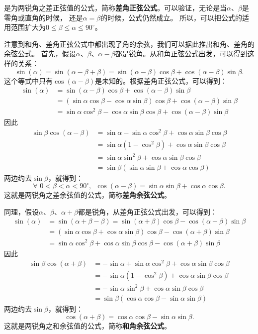 \documentclass[12pt,UTF8]{ctexbook}
\begin{document}
是为两锐角之差正弦值的公式，简称\textbf{差角正弦公式}。可以验证，无论是当$\alpha$、$\beta$是零角或直角的时候，
还是$\alpha = \beta$的时候，公式仍然成立。
所以，可以把公式的适用范围扩大为$0 \leqslant \beta \leqslant \alpha \leqslant 90^\circ$。

注意到和角、差角正弦公式中都出现了角的余弦，我们可以据此推出和角、差角的余弦公式。
首先，假设$\alpha$、$\beta$、$\alpha - \beta$都是锐角。从和角正弦公式出发，可以得到这样的关系：
$$ \sin(\alpha) = \sin(\alpha - \beta + \beta) = \sin (\alpha - \beta) \cos \beta + \cos(\alpha - \beta) \sin\beta.$$
这个等式中只有$\cos(\alpha - \beta)$是未知的。根据差角正弦公式，可以得到：
\begin{align*}
    \sin(\alpha) &= \sin (\alpha - \beta) \cos \beta + \cos(\alpha - \beta) \sin\beta  \\
    &= (\sin\alpha \cos \beta - \cos \alpha \sin\beta) \cos \beta + \cos(\alpha - \beta) \sin\beta  \\
    &= \sin\alpha \cos^2 \beta - \cos \alpha \sin\beta \cos \beta + \cos(\alpha - \beta) \sin\beta 
 \end{align*}
因此
\begin{align*}
    \sin\beta \cos(\alpha - \beta) &= \sin \alpha - \sin\alpha \cos^2 \beta + \cos \alpha \sin\beta \cos \beta  \\
    &= \sin \alpha (1 - \cos^2 \beta) + \cos \alpha \sin\beta \cos \beta  \\
    &= \sin\alpha \sin^2 \beta + \cos \alpha \sin\beta \cos \beta  \\
    &= \sin\beta (\sin\alpha \sin \beta +  \cos \alpha \cos \beta) 
 \end{align*}
两边约去$\sin \beta$，就得到：
$$ \forall \,\, 0 <  \beta < \alpha < 90^\circ , \,\,\, \cos(\alpha - \beta) = \sin\alpha \sin \beta +  \cos \alpha \cos \beta. $$
这就是两锐角之差余弦值的公式，简称\textbf{差角余弦公式}。

同理，假设$\alpha$、$\beta$、$\alpha + \beta$都是锐角，从差角正弦公式出发，可以得到：
\begin{align*}
      \sin(\alpha) &= \sin(\alpha + \beta - \beta) = \sin (\alpha + \beta) \cos \beta - \cos(\alpha + \beta) \sin\beta  \\
      &= (\sin\alpha \cos \beta + \cos \alpha \sin\beta) \cos \beta - \cos(\alpha + \beta) \sin\beta  \\
      &= \sin\alpha \cos^2 \beta + \cos \alpha \sin\beta \cos \beta - \cos(\alpha + \beta) \sin\beta  
 \end{align*}
因此
\begin{align*}
    \sin\beta \cos(\alpha + \beta)  &= -\sin \alpha + \sin\alpha \cos^2 \beta + \cos \alpha \sin\beta \cos \beta  \\
    &= -\sin \alpha (1 - \cos^2 \beta) + \cos \alpha \sin\beta \cos \beta  \\
    &= -\sin\alpha \sin^2 \beta + \cos \alpha \sin\beta \cos \beta  \\
    &= \sin\beta (\cos \alpha \cos \beta - \sin\alpha \sin \beta) 
 \end{align*}
两边约去$\sin \beta$，就得到：
$$  \cos(\alpha + \beta) = \cos \alpha \cos \beta - \sin\alpha \sin \beta. $$
这就是两锐角之和余弦值的公式，简称\textbf{和角余弦公式}。
\end{document}

